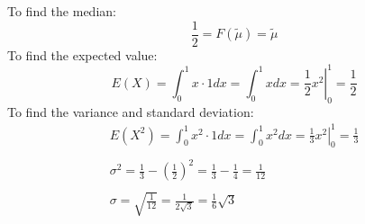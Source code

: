 \documentclass[letterpaper,12pt,fleqn]{article}
\newcommand{\med}{\tilde{\mu}}
\renewcommand{\o}{\sigma}
\begin{document}
\begin{example}
  To find the median:
  \[\frac{1}{2}=F(\med)=\med\]
  To find the expected value:
  \[E(X)=\int_0^1x\cdot1dx=\int_0^1xdx=\left.\frac{1}{2}x^2\right|_0^1=\frac{1}{2}\]
  To find the variance and standard deviation:
  \begin{gather*}
    E(X^2)=\int_0^1x^2\cdot1dx=\int_0^1x^2dx=\left.\frac{1}{3}x^2\right|_0^1=\frac{1}{3} \\
    \\
    \o^2=\frac{1}{3}-\left(\frac{1}{2}\right)^2=\frac{1}{3}-\frac{1}{4}=\frac{1}{12} \\
    \\
    \o=\sqrt{\frac{1}{12}}=\frac{1}{2\sqrt{3}}=\frac{1}{6}\sqrt{3}
  \end{gather*}
\end{example}

\bigskip
\end{document}
